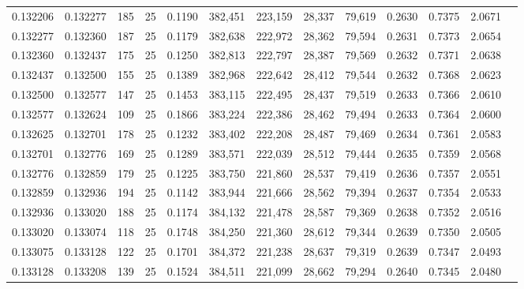 \begin{tabular}{rrrrrrrrrrrrr}
0.132206 & 0.132277 &   185 &  25 &                                     0.1190 & 382,451 & 223,159 &  28,337 &  79,619 & 0.2630 & 0.7375 & 2.0671 \\
0.132277 & 0.132360 &   187 &  25 &                                     0.1179 & 382,638 & 222,972 &  28,362 &  79,594 & 0.2631 & 0.7373 & 2.0654 \\
0.132360 & 0.132437 &   175 &  25 &                                     0.1250 & 382,813 & 222,797 &  28,387 &  79,569 & 0.2632 & 0.7371 & 2.0638 \\
0.132437 & 0.132500 &   155 &  25 &                                     0.1389 & 382,968 & 222,642 &  28,412 &  79,544 & 0.2632 & 0.7368 & 2.0623 \\
0.132500 & 0.132577 &   147 &  25 &                                     0.1453 & 383,115 & 222,495 &  28,437 &  79,519 & 0.2633 & 0.7366 & 2.0610 \\
0.132577 & 0.132624 &   109 &  25 &                                     0.1866 & 383,224 & 222,386 &  28,462 &  79,494 & 0.2633 & 0.7364 & 2.0600 \\
0.132625 & 0.132701 &   178 &  25 &                                     0.1232 & 383,402 & 222,208 &  28,487 &  79,469 & 0.2634 & 0.7361 & 2.0583 \\
0.132701 & 0.132776 &   169 &  25 &                                     0.1289 & 383,571 & 222,039 &  28,512 &  79,444 & 0.2635 & 0.7359 & 2.0568 \\
0.132776 & 0.132859 &   179 &  25 &                                     0.1225 & 383,750 & 221,860 &  28,537 &  79,419 & 0.2636 & 0.7357 & 2.0551 \\
0.132859 & 0.132936 &   194 &  25 &                                     0.1142 & 383,944 & 221,666 &  28,562 &  79,394 & 0.2637 & 0.7354 & 2.0533 \\
0.132936 & 0.133020 &   188 &  25 &                                     0.1174 & 384,132 & 221,478 &  28,587 &  79,369 & 0.2638 & 0.7352 & 2.0516 \\
0.133020 & 0.133074 &   118 &  25 &                                     0.1748 & 384,250 & 221,360 &  28,612 &  79,344 & 0.2639 & 0.7350 & 2.0505 \\
0.133075 & 0.133128 &   122 &  25 &                                     0.1701 & 384,372 & 221,238 &  28,637 &  79,319 & 0.2639 & 0.7347 & 2.0493 \\
0.133128 & 0.133208 &   139 &  25 &                                     0.1524 & 384,511 & 221,099 &  28,662 &  79,294 & 0.2640 & 0.7345 & 2.0480 \\

\end{tabular}

